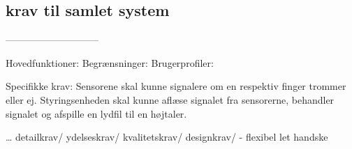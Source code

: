 \subsection{krav til samlet system}


 


-----------------------------

Hovedfunktioner: 
Begrænsninger:
Brugerprofiler:

Specifikke krav: 
Sensorene skal kunne signalere om en respektiv finger trommer eller ej. 
Styringsenheden skal kunne aflæse signalet fra sensorerne, behandler signalet og afspille en lydfil til en højtaler.

… detailkrav/
ydelseskrav/
kvalitetskrav/
designkrav/ - flexibel let handske      

 
